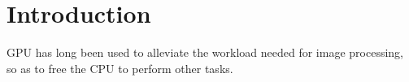 
\section{Introduction}

 GPU has long been used to alleviate the workload needed for image processing, so as to free the CPU to perform other tasks.

